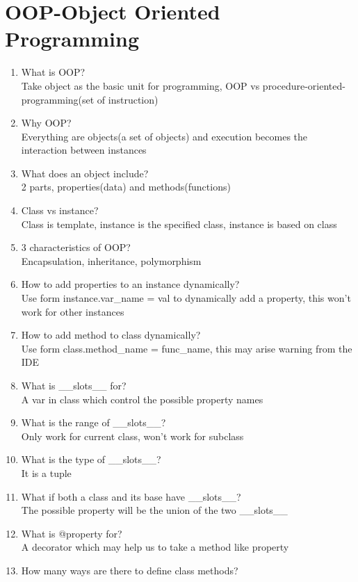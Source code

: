\documentclass[10pt,a4paper,oneside]{article}
\begin{document}
\section{OOP-Object Oriented Programming}
\begin{enumerate}[1.]
\item What is OOP?\\
Take object as the basic unit for programming, OOP vs procedure-oriented-programming(set of instruction)
\item Why OOP?\\
Everything are objects(a set of objects) and execution becomes the interaction between instances
\item What does an object include?\\
2 parts, properties(data) and methods(functions)
\item Class vs instance?\\
Class is template, instance is the specified class, instance is based on class
\item 3 characteristics of OOP?\\
Encapsulation, inheritance, polymorphism
\item How to add properties to an instance dynamically?\\
Use form instance.var\_name = val to dynamically add a property, this won't work for other instances
\item How to add method to class dynamically?\\
Use form class.method\_name = func\_name, this may arise warning from the IDE
\item What is \_\_slots\_\_ for?\\
A var in class which control the possible property names
\item What is the range of \_\_slots\_\_?\\
Only work for current class, won't work for subclass
\item What is the type of \_\_slots\_\_?\\
It is a tuple
\item What if both a class and its base have \_\_slots\_\_?\\
The possible property will be the union of the two \_\_slots\_\_
\item What is @property for?\\
A decorator which may help us to take a method like property
\item How many ways are there to define class methods?\\

\end{enumerate}
\end{document}
